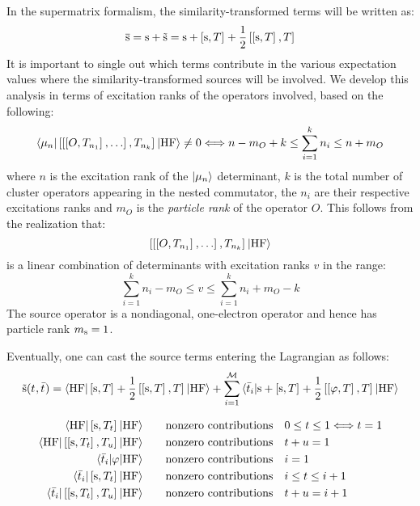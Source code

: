 In the supermatrix formalism, the similarity-transformed terms will be
written as:
\begin{equation}
  \overline{\mathrm{s}} = \mathrm{s} + \tilde{\mathrm{s}} = \mathrm{s} +
  \left[ \mathrm{s}, T \right]^{} +
  \frac{1}{2}\left[ \left[ \mathrm{s}, T \right]^{}, T \right]^{}
\end{equation}
It is important to single out which terms contribute in the various
expectation values where the similarity-transformed sources will be
involved.
We develop this analysis in terms of excitation ranks of the
operators involved, based on the following:
\begin{equation}
  \braket{\mu_n |
  \left[ \left[ \left[ O, T_{n_1} \right]^{}, \ldots \right]^{}, T_{n_k} \right]^{} | \mathrm{HF}} \neq 0
  \Longleftrightarrow
  n - m_O + k \leq \sum_{i=1}^k n_i \leq n + m_O
\end{equation}
where $n$ is the excitation rank of the $\ket{\mu_n}$ determinant, $k$
is the total number of cluster operators appearing in the nested
commutator, the $n_i$ are their respective excitations ranks and $m_O$
is the \emph{particle rank} of the operator $O$.\autocite{Helgaker2000-tz}
This follows from the realization that:
\begin{equation}
  \left[ \left[ \left[ O, T_{n_1} \right]^{}, \ldots \right]^{}, T_{n_k} \right]^{} \ket{\mathrm{HF}}
\end{equation}
is a linear combination of determinants with excitation ranks $v$ in the
range:
\begin{equation}
  \sum_{i=1}^k n_i - m_O \leq v \leq \sum_{i=1}^k n_i + m_O -k
\end{equation}
The source operator is a nondiagonal, one-electron
operator and hence has particle rank $m_{\mathrm{s}} = 1$.

Eventually, one can cast the source terms entering the Lagrangian as
follows:
\begin{equation}
  \tilde{\mathrm{s}}(t_{}, \bar{t}_{}) =
  \braket{\mathrm{HF} | \left[ \mathrm{s}, T \right]^{} + \frac{1}{2}\left[ \left[ \mathrm{s}, T \right]^{}, T \right]^{} | \mathrm{HF}}
  + \sum_{i=1}^{\mathcal{M}}\braket{\bar{t}_{i} | \mathrm{s} + \left[ \mathrm{s}, T \right]^{} + \frac{1}{2}\left[ \left[ \varphi, T \right]^{}, T \right]^{} | \mathrm{HF}}
\end{equation}

\begin{align}
  \braket{\mathrm{HF} |
  \left[ \mathrm{s}, T_t \right]^{}
  | \mathrm{HF}}
  &\quad\quad\text{nonzero contributions} \quad 0 \leq t \leq 1
  \Longleftrightarrow t = 1 \\
  \braket{\mathrm{HF} |
  \left[ \left[ \mathrm{s}, T_t \right]^{}, T_u \right]^{}
  | \mathrm{HF}}
  &\quad\quad\text{nonzero contributions} \quad t + u = 1 \\
  \braket{\bar{t}_{i} |
  \varphi
  | \mathrm{HF} }
  &\quad\quad\text{nonzero contributions} \quad i = 1 \\
  \braket{\bar{t}_{i} |
  \left[ \mathrm{s}, T_t \right]^{}
  | \mathrm{HF} }
  &\quad\quad\text{nonzero contributions} \quad i \leq t \leq i + 1 \\
  \braket{\bar{t}_{i} |
  \left[ \left[ \mathrm{s}, T_t \right]^{}, T_u \right]^{}
  | \mathrm{HF} }
  &\quad\quad\text{nonzero contributions} \quad t + u = i + 1
\end{align}


